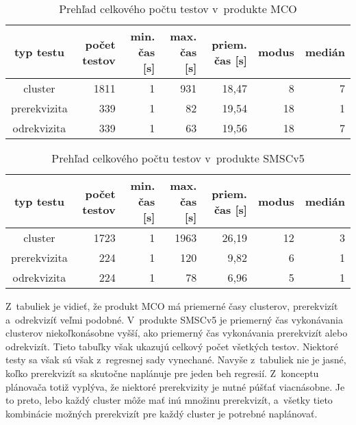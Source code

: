 \begin{table}
  \begin{center}
    \begin{tabular}{| c | r | r | r | r | r | r |}
    \hline
    typ testu & počet testov & min. čas [s] & max. čas [s] & priem. čas [s] & modus & medián \\ \hline
    cluster      & 1811 & 1 & 931 & 18,47 & 8  & 7 \\ \hline
    prerekvizita & 339  & 1 & 82  & 19,54 & 18 & 1 \\ \hline
    odrekvizita  & 339  & 1 & 63  & 19,56 & 18 & 7 \\
    \hline
    \end{tabular}
    \label{table:testy_mco}
    \caption{Prehľad celkového počtu testov v~produkte MCO}
  \end{center}
\end{table}

\begin{table}
  \begin{center}
    \begin{tabular}{| c | r | r | r | r | r | r |}
    \hline
    typ testu & počet testov & min. čas [s] & max. čas [s] & priem. čas [s] & modus & medián \\ \hline
    cluster      & 1723 & 1 & 1963 & 26,19 & 12 & 3 \\ \hline
    prerekvizita & 224  & 1 & 120  & 9,82  & 6  & 1 \\ \hline
    odrekvizita  & 224  & 1 & 78   & 6,96  & 5  & 1 \\
    \hline
    \end{tabular}
    \label{table:testy_smscv5}
    \caption{Prehľad celkového počtu testov v~produkte SMSCv5}
  \end{center}
\end{table}

Z~tabuliek je vidieť, že produkt MCO má priemerné časy clusterov, prerekvizít a~odrekvizíť veľmi podobné.
V~produkte SMSCv5 je priemerný čas vykonávania clusterov niekoľkonásobne vyšší, ako priemerný čas vykonávania prerekvizít alebo odrekvizít.
Tieto tabuľky však ukazujú celkový počet všetkých testov. Niektoré testy sa však sú však z~regresnej sady vynechané.
Navyše z~tabuliek nie je jasné, koľko prerekvizít sa skutočne naplánuje pre jeden beh regresií.
Z~konceptu plánovača totiž vyplýva, že niektoré prerekvizity je nutné púšťať viacnásobne.
Je to preto, lebo každý cluster môže mať inú množinu prerekvizít, a~všetky tieto kombinácie možných prerekvizít pre každý cluster
je potrebné naplánovať.

